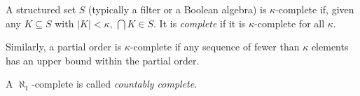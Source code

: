 \documentclass[12pt]{article}
\begin{document}
A structured set $S$ (typically a filter or a Boolean algebra) is $\kappa$-complete if, given any $K\subseteq S$ with $|K|<\kappa$, $\bigcap K\in S$.  It is \emph{complete} if it is $\kappa$-complete for all $\kappa$.

Similarly, a partial order is $\kappa$-complete if any sequence of fewer than $\kappa$ elements has an upper bound within the partial order.

A $\aleph_1$-complete  is called \emph{countably complete}.
\end{document}
